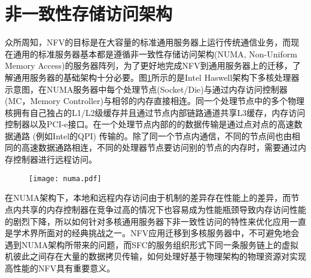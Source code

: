 \section{非一致性存储访问架构}
众所周知，NFV的目标是在大容量的标准通用服务器上运行传统通信业务，而现在通用的标准服务器基本都是遵循非一致性存储访问架构(NUMA, Non-Uniform Memory Access)的服务器阵列，为了更好地完成NFV到通用服务器上的迁移，了解通用服务器的基础架构十分必要。图\ref{fig:numa}所示的是Intel Haswell架构下多核处理器示意图，在NUMA服务器中每个处理节点(Socket/Die)与通过内存访问控制器(MC，Memory Controller)与相邻的内存直接相连。同一个处理节点中的多个物理核拥有自己独占的L1/L2级缓存并且通过节点内部链路通道共享L3缓存，内存访问控制器以及PCI-e接口。在一个处理节点内部的的数据传输是通过点对点的高速数据通路 (例如Intel的QPI) 传输的。除了同一个节点内通信，不同的节点间也由相同的高速数据通路相连，不同的处理器节点要访问别的节点的内存时，需要通过内存控制器进行远程访问。
\begin{figure}[!htp]
	\label{fig:numa}
	\centering
	\texttt{[image: numa.pdf]}
\end{figure}
在NUMA架构下，本地和远程内存访问由于机制的差异存在性能上的差异，而节点内共享的内存控制器在竞争过高的情况下也容易成为性能瓶颈导致内存访问性能的剧烈下降，所以如何针对多核通用服务器下非一致性访问的特性来优化应用一直是学术界所面对的经典挑战之一。NFV应用迁移到多核服务器中，不可避免地会遇到NUMA架构所带来的问题，而SFC的服务组织形式下同一条服务链上的虚拟机彼此之间存在大量的数据拷贝传输，如何处理好基于物理架构的物理资源对实现高性能的NFV具有重要意义。
\begin{figure}[!htp]
	\centering
\end{figure}
